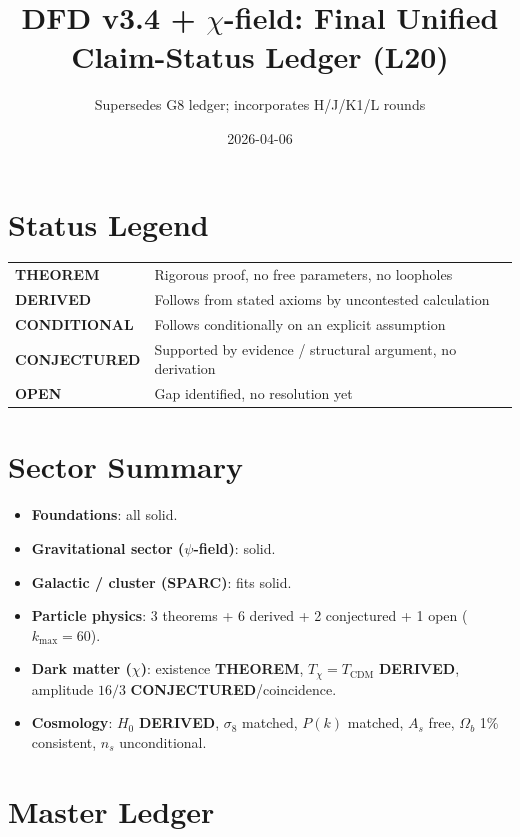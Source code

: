 \documentclass[11pt]{article}
\title{DFD v3.4 + $\chi$-field: Final Unified Claim-Status Ledger (L20)}
\author{Supersedes G8 ledger; incorporates H/J/K1/L rounds}
\date{2026-04-06}
\newcommand{\THM}{\textcolor{thmcol}{\textbf{THEOREM}}}
\newcommand{\DER}{\textcolor{dercol}{\textbf{DERIVED}}}
\newcommand{\CON}{\textcolor{condcol}{\textbf{CONDITIONAL}}}
\newcommand{\CNJ}{\textcolor{conjcol}{\textbf{CONJECTURED}}}
\newcommand{\OPN}{\textcolor{opencol}{\textbf{OPEN}}}
\begin{document}
\maketitle

\section*{Status Legend}
\begin{tabular}{ll}
\THM     & Rigorous proof, no free parameters, no loopholes \\
\DER     & Follows from stated axioms by uncontested calculation \\
\CON     & Follows conditionally on an explicit assumption \\
\CNJ     & Supported by evidence / structural argument, no derivation \\
\OPN     & Gap identified, no resolution yet \\
\end{tabular}

\section*{Sector Summary}
\begin{itemize}\itemsep1pt
  \item \textbf{Foundations}: all solid.
  \item \textbf{Gravitational sector ($\psi$-field)}: solid.
  \item \textbf{Galactic / cluster (SPARC)}: fits solid.
  \item \textbf{Particle physics}: 3 theorems + 6 derived + 2 conjectured + 1 open ($k_{\max}{=}60$).
  \item \textbf{Dark matter ($\chi$)}: existence \THM, $T_\chi{=}T_\text{CDM}$ \DER, amplitude $16/3$ \CNJ/coincidence.
  \item \textbf{Cosmology}: $H_0$ \DER, $\sigma_8$ matched, $P(k)$ matched, $A_s$ free, $\Omega_b$ 1\% consistent, $n_s$ unconditional.
\end{itemize}

\section*{Master Ledger}
\end{document}
